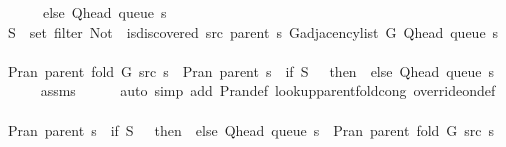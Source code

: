 \begin{isabellebody}
\ \ \ \ \ \ else\ {\isacharbraceleft}{\kern0pt}Q{\isacharunderscore}{\kern0pt}head\ {\isacharparenleft}{\kern0pt}queue\ s{\isacharparenright}{\kern0pt}{\isacharbraceright}{\kern0pt}{\isacharparenright}{\kern0pt}{\isachardoublequoteclose}%
\endisataginvisible
{\isafoldinvisible}%
%
\isadeliminvisible
\isanewline
%
\endisadeliminvisible
%
\isadelimproof
%
\endisadelimproof
%
\isatagproof
{}\isamarkupfalse%
\isanewline
\ \ \isamarkupfalse%
\ {\isacharquery}{\kern0pt}S\ {\isacharequal}{\kern0pt}\ {\isachardoublequoteopen}set\ {\isacharparenleft}{\kern0pt}filter\ {\isacharparenleft}{\kern0pt}Not\ {\isasymcirc}\ is{\isacharunderscore}{\kern0pt}discovered\ src\ {\isacharparenleft}{\kern0pt}parent\ s{\isacharparenright}{\kern0pt}{\isacharparenright}{\kern0pt}\ {\isacharparenleft}{\kern0pt}G{\isachardot}{\kern0pt}adjacency{\isacharunderscore}{\kern0pt}list\ G\ {\isacharparenleft}{\kern0pt}Q{\isacharunderscore}{\kern0pt}head\ {\isacharparenleft}{\kern0pt}queue\ s{\isacharparenright}{\kern0pt}{\isacharparenright}{\kern0pt}{\isacharparenright}{\kern0pt}{\isacharparenright}{\kern0pt}{\isachardoublequoteclose}\isanewline
\ \ \isamarkupfalse%
\ {\isachardoublequoteopen}P{\isachardot}{\kern0pt}ran\ {\isacharparenleft}{\kern0pt}parent\ {\isacharparenleft}{\kern0pt}fold\ G\ src\ s{\isacharparenright}{\kern0pt}{\isacharparenright}{\kern0pt}\ {\isasymsubseteq}\ P{\isachardot}{\kern0pt}ran\ {\isacharparenleft}{\kern0pt}parent\ s{\isacharparenright}{\kern0pt}\ {\isasymunion}\ {\isacharparenleft}{\kern0pt}if\ {\isacharquery}{\kern0pt}S\ {\isacharequal}{\kern0pt}\ {\isacharbraceleft}{\kern0pt}{\isacharbraceright}{\kern0pt}\ then\ {\isacharbraceleft}{\kern0pt}{\isacharbraceright}{\kern0pt}\ else\ {\isacharbraceleft}{\kern0pt}Q{\isacharunderscore}{\kern0pt}head\ {\isacharparenleft}{\kern0pt}queue\ s{\isacharparenright}{\kern0pt}{\isacharbraceright}{\kern0pt}{\isacharparenright}{\kern0pt}{\isachardoublequoteclose}\isanewline
\ \ \ \ \isamarkupfalse%
\ assms\isanewline
\ \ \ \ \isamarkupfalse%
\ {\isacharparenleft}{\kern0pt}auto\ simp\ add{\isacharcolon}{\kern0pt}\ P{\isachardot}{\kern0pt}ran{\isacharunderscore}{\kern0pt}def\ lookup{\isacharunderscore}{\kern0pt}parent{\isacharunderscore}{\kern0pt}fold{\isacharunderscore}{\kern0pt}cong{\isacharunderscore}{\kern0pt}{}\ override{\isacharunderscore}{\kern0pt}on{\isacharunderscore}{\kern0pt}def{\isacharparenright}{\kern0pt}\isanewline
\ \ \isamarkupfalse%
\ {\isachardoublequoteopen}P{\isachardot}{\kern0pt}ran\ {\isacharparenleft}{\kern0pt}parent\ s{\isacharparenright}{\kern0pt}\ {\isasymunion}\ {\isacharparenleft}{\kern0pt}if\ {\isacharquery}{\kern0pt}S\ {\isacharequal}{\kern0pt}\ {\isacharbraceleft}{\kern0pt}{\isacharbraceright}{\kern0pt}\ then\ {\isacharbraceleft}{\kern0pt}{\isacharbraceright}{\kern0pt}\ else\ {\isacharbraceleft}{\kern0pt}Q{\isacharunderscore}{\kern0pt}head\ {\isacharparenleft}{\kern0pt}queue\ s{\isacharparenright}{\kern0pt}{\isacharbraceright}{\kern0pt}{\isacharparenright}{\kern0pt}\ {\isasymsubseteq}\ P{\isachardot}{\kern0pt}ran\ {\isacharparenleft}{\kern0pt}parent\ {\isacharparenleft}{\kern0pt}fold\ G\ src\ s{\isacharparenright}{\kern0pt}{\isacharparenright}{\kern0pt}{\isachardoublequoteclose}\isanewline

\end{isabellebody}
